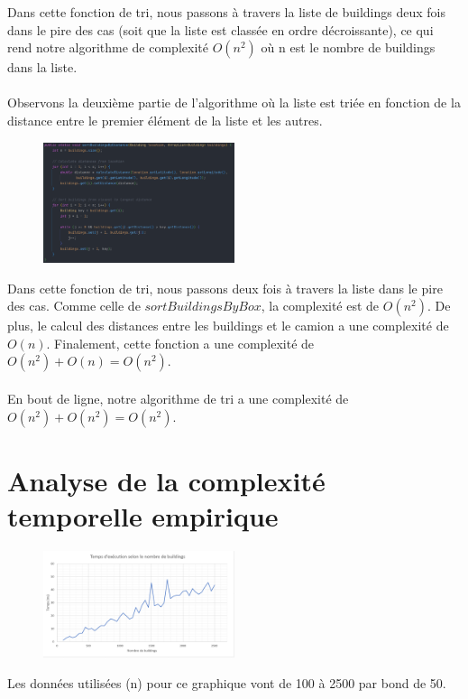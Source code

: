 \documentclass{article}
\begin{document}
Dans cette fonction de tri, nous passons à travers la liste de buildings deux fois dans le pire des cas (soit que la liste est classée en ordre décroissante), ce qui rend notre algorithme de complexité $O(n^2)$ où n est le nombre de buildings dans la liste.
\\ \\
Observons la deuxième partie de l'algorithme où la liste est triée en fonction de la distance entre le premier élément de la liste et les autres.

\begin{figure}[htp]
\centering
\includegraphics[width=0.5\textwidth]{sortDistance.png}
\end{figure}

Dans cette fonction de tri, nous passons deux fois à travers la liste dans le pire des cas. Comme celle de $sortBuildingsByBox$, la complexité est de $O(n^2)$. De plus, le calcul des distances entre les buildings et le camion a une complexité de $O(n)$. Finalement, cette fonction a une complexité de $O(n^2) + O(n) = O(n^2)$.
\\ \\
En bout de ligne, notre algorithme de tri a une complexité de $O(n^2) + O(n^2) = O(n^2)$.

\section{Analyse de la complexité temporelle empirique}

\begin{figure}[htp]
\centering
\includegraphics[width=0.5\textwidth]{analyse.png}
\end{figure}

Les données utilisées (n) pour ce graphique vont de 100 à 2500 par bond de 50.
\end{document}
